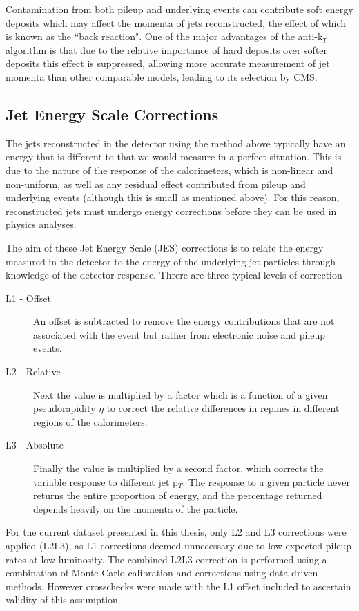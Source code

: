 Contamination from both pileup and underlying events can contribute soft energy deposits which may affect the momenta of jets reconstructed, the effect of which is known as the ``back reaction". One of the major advantages of the anti-k$_{T}$ algorithm is that due to the relative importance of hard deposits over softer deposits this effect is suppressed, allowing more accurate measurement of jet momenta than other comparable models, leading to its selection by CMS.
\subsection{Jet Energy Scale Corrections}
\label{sec:JES}
The jets reconstructed in the detector using the method above typically have an energy that is different to that we would measure in a perfect situation. This is due to the nature of the response of the calorimeters, which is non-linear and non-uniform, as well as any residual effect contributed from pileup and underlying events (although this is small as mentioned above). For this reason, reconstructed jets must undergo energy corrections before they can be used in physics analyses. 

The aim of these Jet Energy Scale (JES) corrections is to relate the energy measured in the detector to the energy of the underlying jet particles through knowledge of the detector response. Threre are three typical levels of correction 

\begin{description}
\item[L1 - Offset]{An offset is subtracted to remove the energy contributions that are not associated with the event but rather from electronic noise and pileup events.  }
\item[L2 - Relative]{Next the value is multiplied by a factor which is a function of a given pseudorapidity $\eta$ to correct the relative differences in repines in different regions of the calorimeters.}
\item [L3 - Absolute]{Finally the value is multiplied by a second factor, which corrects the variable response to different jet p$_{T}$. The response to a given particle never returns the entire proportion of energy, and the percentage returned depends heavily on the momenta of the particle.}
\end{description}

For the current dataset presented in this thesis, only L2 and L3 corrections were applied (L2L3), as L1 corrections deemed unnecessary due to low expected pileup rates at low luminosity. The combined L2L3 correction is performed using a combination of Monte Carlo calibration and corrections using data-driven methods. However crosschecks were made with the L1 offset included to ascertain validity of this assumption.

